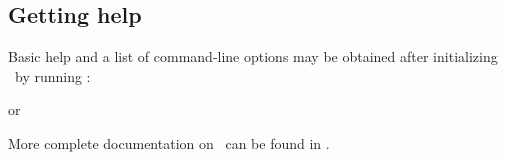\subsection{Getting help}

Basic help and a list of command-line options may be obtained after
initializing \oracdr\ by running :
\begin{terminalv}
\end{terminalv}
or
\begin{terminalv}
\end{terminalv}

More complete documentation on \oracdr\ can be found in \oracsun.

